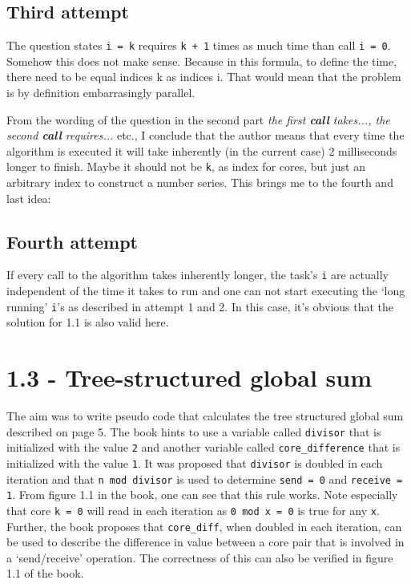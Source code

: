 \documentclass[a4paper,11pt,twoside]{article}
\begin{document}
\subsection{Third attempt}
The question states \verb+i = k+ requires \verb!k + 1! times as much time than call \verb+i = 0+. Somehow this does not make sense. Because in this formula, to define the time, there need to be equal indices k as indices i. That would mean that the problem is by definition embarrasingly parallel.

From the wording of the question in the second part \textit{the first \textbf{call} takes..., the second \textbf{call} requires...} etc., I conclude that the author means that every time the algorithm is executed it will take inherently (in the current case) 2 milliseconds longer to finish. Maybe it should not be \verb+k+, as index for cores, but just an arbitrary index to construct a number series. This brings me to the fourth and last idea:

\subsection{Fourth attempt}
If every call to the algorithm takes inherently longer, the task's \verb+i+ are actually independent of the time it takes to run and one can not start executing the `long running' \verb+i+'s as described in attempt 1 and 2. In this case, it's obvious that the solution for 1.1 is also valid here. 

\section{1.3 - Tree-structured global sum}
The aim was to write pseudo code that calculates the tree structured global sum described on page 5. The book hints to use a variable called \verb+divisor+ that is initialized with the value \verb+2+ and another variable called \verb+core_difference+ that is initialized with the value \verb+1+. It was proposed that \verb+divisor+ is doubled in each iteration and that \verb+n mod divisor+ is used to determine \verb+send = 0+ and \verb+receive = 1+. From figure 1.1 in the book, one can see that this rule works. Note especially that core \verb+k = 0+ will read in each iteration as \verb+0 mod x = 0+ is true for any \verb+x+. Further, the book proposes that \verb+core_diff+, when doubled in each iteration, can be used to describe the difference in value between a core pair that is involved in a `send/receive' operation. The correctness of this can also be verified in figure 1.1 of the book.
\end{document}
